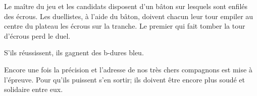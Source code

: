 \documentclass{grand-jeu}
\begin{document}
\begin{liste-materiel}
\end{liste-materiel}

\begin{regles}
Le maître du jeu et les candidats disposent d'un bâton sur lesquels sont enfilés des écrous. Les duellistes, à l'aide du bâton, doivent chacun leur tour empiler au centre du plateau les écrous sur la tranche. Le premier qui fait tomber la tour d'écrous perd le duel.

S’ils réussissent, ils gagnent des b-dures bleu.
\end{regles}

\begin{imaginaire}
Encore une fois la précision et l'adresse de nos très chers compagnons est mise à l'épreuve.
Pour qu'ils puissent s'en sortir; ils doivent être encore plus soudé et solidaire entre eux.
\end{imaginaire}

\begin{moments-stop}
\end{moments-stop}
\end{document}
